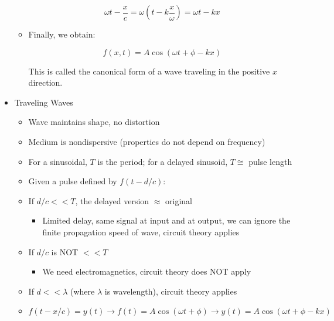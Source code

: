 \begin{itemize}
\begin{itemize}
        $$\omega t-\frac{x}{c}=\omega \left( t-k\frac{x}{\omega} \right)=\omega t-kx$$

      \item Finally, we obtain:

        $$f(x,t)=A\cos(\omega t+\phi - kx)$$

        This is called the canonical form of a wave traveling in the positive $x$ direction.

    \end{itemize}

  \item Traveling Waves

    \begin{itemize}

      \item Wave maintains shape, no distortion

      \item Medium is nondispersive (properties do not depend on frequency)

      \item For a sinusoidal, $T$ is the period; for a delayed sinusoid, $T\cong$ pulse length

      \item Given a pulse defined by $f(t-d/c)$:

      \item If $d/c<<T$, the delayed version $\approx$ original

        \begin{itemize}

          \item Limited delay, same signal at input and at output, we can ignore the finite propagation speed of wave, circuit theory applies

        \end{itemize}

      \item If $d/c$ is NOT $<<T$

        \begin{itemize}

          \item We need electromagnetics, circuit theory does NOT apply

        \end{itemize}

      \item If $d<<\lambda$ (where $\lambda$ is wavelength), circuit theory applies

      \item $f(t-x/c)=y(t)\rightarrow f(t)=A\cos(\omega t+\phi)\rightarrow y(t)=A\cos(\omega t+\phi-kx)$


\end{itemize}
\end{itemize}
